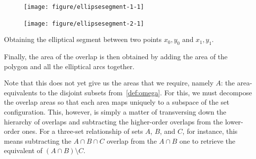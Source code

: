 \documentclass[
  oneside,
  openany,
  numbers=noendperiod,
  parskip=half,
  bibliography=totoc
]{scrbook}\usepackage[]{graphicx}\usepackage{xcolor}
\newenvironment{knitrout}{}{} %
\begin{document}
\begin{marginfigure}
\begin{subfigure}[b]{\linewidth}
\begin{knitrout}\small
{}\color{fgcolor}

{\centering \texttt{[image: figure/ellipsesegment-1-1]} 

}



\end{knitrout}
\end{subfigure}
\begin{subfigure}[b]{\linewidth}
\begin{knitrout}\small
{}\color{fgcolor}

{\centering \texttt{[image: figure/ellipsesegment-2-1]} 

}



\end{knitrout}
\end{subfigure}
\caption{Obtaining the elliptical segment between two points $x_0,y_0$ and
$x_1,y_1$.}
\label{fig:ellipsesegment}
\end{marginfigure}

Finally, the area of the overlap is then obtained by adding the area of the
polygon and all the elliptical arcs together.

Note that this does not yet give us
the areas that we require, namely $A$: the area-equivalents to the disjoint
subsets from~\cref{def:omega}. For this, we must
decompose the overlap areas so that each area maps uniquely
to a subspace of the set configuration. This, however, is simply a matter of transversing down the
hierarchy of overlaps and subtracting the higher-order overlaps from the
lower-order ones. For a three-set relationship of sets $A$, $B$, and $C$,
for instance, this means subtracting the $A\cap B \cap C$ overlap from
the $A \cap B$ one to retrieve the equivalent of $(A \cap B) \setminus C$.
\end{document}
